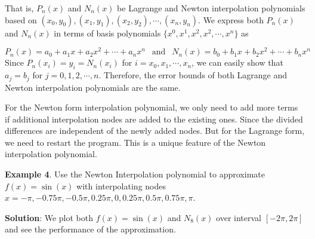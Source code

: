 \documentclass[
]{book}
\begin{document}
That is, \(P_n(x)\) and \(N_n(x)\) be Lagrange and Newton interpolation polynomials based on \((x_0, y_0), (x_1, y_1), (x_2, y_2), \cdots, (x_n, y_n)\). We express both \(P_n(x)\) and \(N_n(x)\) in terms of basis polynomials \(\{x^0, x^1, x^2, x^2, \cdots, x^n \}\) as

\[
P_n(x) = a_0 + a_1x + a_2x^2 + \cdots + a_nx^n \ \ \text{ and } \ \ N_n(x) = b_0 + b_1x + b_2x^2 + \cdots + b_nx^n
\]
Since \(P_n(x_i) = y_i = N_n(x_i)\) for \(i = x_0, x_1, \cdots, x_n\), we can easily show that \(a_j = b_j\) for \(j = 0, 1, 2, \cdots, n\). Therefore, the error bounds of both Lagrange and Newton interpolation polynomials are the same.

For the Newton form interpolation polynomial, we only need to add more terms if additional interpolation nodes are added to the existing ones. Since the divided differences are independent of the newly added nodes. But for the Lagrange form, we need to restart the program. This is a unique feature of the Newton interpolation polynomial.

\textbf{Example 4}. Use the Newton Interpolation polynomial to approximate \(f(x) = \sin(x)\) with interpolating nodes \(x = -\pi, -0.75\pi, -0.5\pi, 0.25\pi, 0, 0.25\pi, 0.5\pi, 0.75\pi, \pi\).

\textbf{Solution}: We plot both \(f(x) = \sin(x)\) and \(N_8(x)\) over interval \([-2\pi, 2\pi]\) and see the performance of the approximation.
\end{document}
